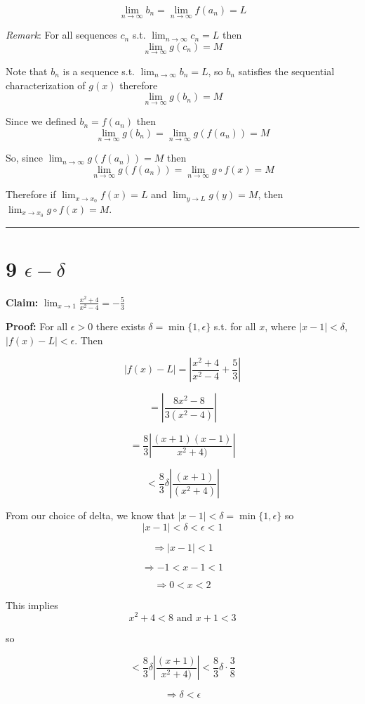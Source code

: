 \documentclass[10pt,letterpaper]{article}
\newcommand\ds{\displaystyle}
\newcommand\qedsym{\hfill \rule{2mm}{2mm}}
\begin{document}
\[\lim_{n\to\infty}b_n = \lim_{n\to\infty}f(a_n) = L\]

\textit{Remark}: For all sequences $c_n$ s.t. $\ds\lim_{n\to\infty} c_n = L$ then 
\[\lim_{n\to\infty} g(c_n) = M\]

Note that $b_n$ is a sequence s.t. $\ds\lim_{n\to\infty}b_n=L$, so $b_n$ satisfies the sequential characterization of $g(x)$ therefore
\[\lim_{n\to\infty} g(b_n) = M\]

Since we defined $b_n = f(a_n)$ then
\[\lim_{n\to\infty} g(b_n) = \lim_{n\to\infty} g(f(a_n)) = M\]

So, since $\ds\lim_{n\to\infty} g(f(a_n)) = M$ then
\[\lim_{n\to\infty} g(f(a_n)) = \lim_{n\to\infty} g\circ f(x) = M\]

Therefore if $\ds\lim_{x\to x_0} f(x) = L$ and $\ds\lim_{y\to L} g(y) = M$, then $\ds\lim_{x\to x_0} g \circ f(x) = M$.

\qedsym

\section*{9 $\epsilon - \delta$}

\textbf{Claim:} $\ds\lim_{x\to 1}\frac{x^2+4}{x^2-4} = -\frac{5}{3}$

\medskip

\textbf{Proof:} For all $\epsilon > 0$ there exists $\delta = \min\{1, \epsilon\}$ s.t. for all $x$, where $|x-1|<\delta$, $|f(x) - L| < \epsilon$. Then

\[|f(x) - L| = \left|\frac{x^2+4}{x^2-4}+\frac{5}{3}\right|\]

\[=\left|\frac{8x^2-8}{3(x^2-4)}\right|\]

\[=\frac{8}{3}\left|\frac{(x+1)(x-1)}{x^2+4)}\right|\]

\[<\frac{8}{3}\delta\left|\frac{(x+1)}{(x^2+4)}\right|\]

From our choice of delta, we know that $|x-1|<\delta=\min\{1, \epsilon\}$ so \[|x-1|<\delta < \epsilon < 1\]

\[\Rightarrow |x-1| < 1\]

\[\Rightarrow -1 < x-1 < 1\]

\[\Rightarrow 0 < x < 2\]

This implies
\[x^2+4<8 \text{ and } x+1<3\]

so

\[<\frac{8}{3}\delta\left|\frac{(x+1)}{x^2+4)}\right| < \frac{8}{3}\delta\cdot\frac{3}{8}\]

\[\Rightarrow\delta<\epsilon\]
\end{document}
